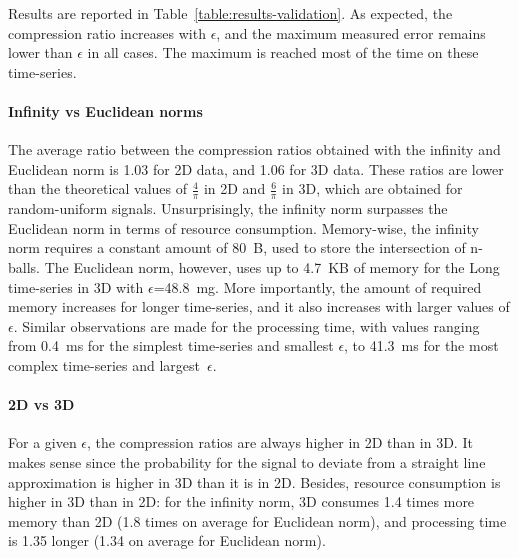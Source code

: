 \documentclass{report}
\begin{document}
Results are reported in Table~\ref{table:results-validation}. 
As expected, the compression ratio increases with $\epsilon$, and the 
maximum measured error remains lower than $\epsilon$ in all cases. The 
maximum is reached most of the time on these time-series.

\paragraph{Infinity vs Euclidean norms}
The average ratio between the compression ratios obtained
with the infinity and Euclidean norm is 1.03 for 2D data, and 1.06
for 3D data. These ratios are lower than the theoretical values of
$\frac{4}{\pi}$ in 2D and $\frac{6}{\pi}$ in 3D, which are obtained for
random-uniform signals. Unsurprisingly, the infinity norm surpasses the
Euclidean norm in terms of resource consumption. Memory-wise, the
infinity norm requires a constant amount of 80~B, used to store the
intersection of n-balls. The Euclidean norm, however, uses up to 4.7~KB of memory
for the Long time-series in 3D with $\epsilon$=48.8~mg. More importantly,
the amount of required memory increases for longer time-series, and it also increases with larger
values of $\epsilon$. Similar observations are made for the processing
time, with values ranging from 0.4~ms for the simplest time-series and
smallest $\epsilon$, to 41.3~ms for the most complex time-series and
largest~$\epsilon$.

\paragraph{2D vs 3D}
For a given $\epsilon$, the compression
ratios are always higher in 2D than in 3D. It makes sense since the
probability for the signal to deviate from a straight line
approximation is higher in 3D than it is in 2D. Besides, resource
consumption is higher in 3D than in 2D: for the infinity norm, 3D
consumes 1.4 times more memory than 2D (1.8 times on average for
Euclidean norm), and processing time is 1.35 longer (1.34 on
average for Euclidean norm).
\end{document}
